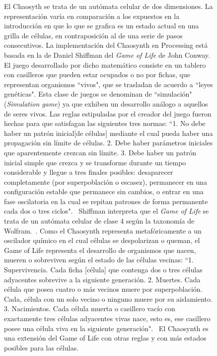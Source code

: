 \documentclass[16pt,spanish]{article}
\begin{document}
\begin{figure}[h!]
	El Chaosyth se trata de un autómata celular de dos dimensiones. La representación varía en comparación a los expuestos en la introducción en que lo que se grafica es un estado actual en una grilla de células, en contraposición al de una serie de pasos consecutivos. La implementación del Chaosynth en Processing está basada en la de Daniel Shiffman del \textit{Game of Life} de John Conway. El juego desarrollado por dicho matemático consiste en un tablero con casilleros que pueden estar ocupados o no por fichas, que representan organismos ``vivos", que se trasladan de acuerdo a ``leyes genéticas". Esta clase de juegos se denominan de  ``simulación"(\textit{Simulation game}) ya que exhiben un desarrollo análogo a aquellos de seres vivos. Las reglas estipuladas por el creador del juego fueron hechas para que satisfagan las siguientes tres normas: ``1. No debe haber un patrón inicial[de células] mediante el cual pueda haber una propagación sin límite de células. 2. Debe haber parámetros iniciales que aparentemente crezcan sin límite. 3. Debe haber un patrón inicial simple que crezca y se transforme durante un tiempo considerable y llegue a tres finales posibles: desaparecer completamente (por superpoblación o escasez), permanecer en una configuración estable que permanece sin cambios, o entrar en una fase oscilatoria en la cual se repitan patrones de forma permanente cada dos o tres ciclos".~\cite{gardner1971mathematical} Shiffman interpreta que el \textit{Game of Life} se trata de un autómata celular de clase 4 según la taxonomía de Wolfram.~\cite{shiffman2012nature}. Como el Chaosynth representa metafóricamente a un oscilador químico en el cual células se despolarizan o queman, el Game of Life representa el desarrollo de organismos que nacen, mueren o sobreviven según el estado de las células vecinas: ``1. Supervivencia. Cada ficha [célula] que contenga dos o tres células adyacentes sobrevive a la siguiente generación. 2. Muertes. Cada célula que posea cuatro o más vecinos muere por superpoblación. Cada, célula con un solo vecino o ninguno muere por su aislamiento. 3. Nacimientos. Cada célula muerta o casillero vacío con exactamente tres células adyacentes vivas nace, esto es, ese casillero posee una célula viva en la siguiente generación".~\cite{gardner1971mathematical} El Chaosynth es una extensión del Game of Life con otras reglas y con más estados posibles para las células.



\end{figure}
\end{document}

